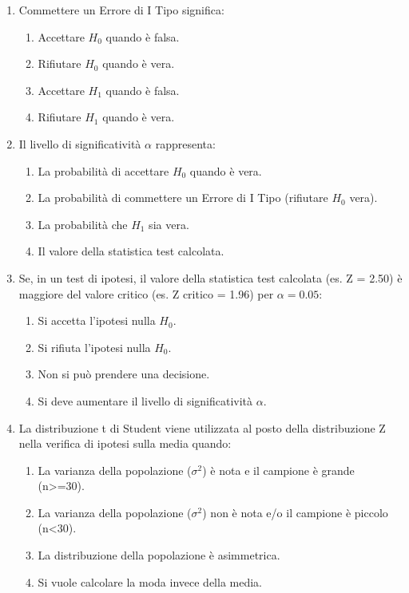 \documentclass[12pt, a4paper]{article}
\begin{document}
\begin{enumerate}
    \item Commettere un Errore di I Tipo significa:
    \begin{enumerate}
        \item Accettare $H_0$ quando è falsa.
        \item Rifiutare $H_0$ quando è vera.
        \item Accettare $H_1$ quando è falsa.
        \item Rifiutare $H_1$ quando è vera.
    \end{enumerate}

    \item Il livello di significatività $\alpha$ rappresenta:
    \begin{enumerate}
        \item La probabilità di accettare $H_0$ quando è vera.
        \item La probabilità di commettere un Errore di I Tipo (rifiutare $H_0$ vera).
        \item La probabilità che $H_1$ sia vera.
        \item Il valore della statistica test calcolata.
    \end{enumerate}

    \item Se, in un test di ipotesi, il valore della statistica test calcolata (es. Z = 2.50) è maggiore del valore critico (es. Z critico = 1.96) per $\alpha=0.05$:
    \begin{enumerate}
        \item Si accetta l'ipotesi nulla $H_0$.
        \item Si rifiuta l'ipotesi nulla $H_0$.
        \item Non si può prendere una decisione.
        \item Si deve aumentare il livello di significatività $\alpha$.
    \end{enumerate}

    \item La distribuzione t di Student viene utilizzata al posto della distribuzione Z nella verifica di ipotesi sulla media quando:
    \begin{enumerate}
        \item La varianza della popolazione ($\sigma^2$) è nota e il campione è grande (n>=30).
        \item La varianza della popolazione ($\sigma^2$) non è nota e/o il campione è piccolo (n<30).
        \item La distribuzione della popolazione è asimmetrica.
        \item Si vuole calcolare la moda invece della media.
    \end{enumerate}


\end{enumerate}
\end{document}

